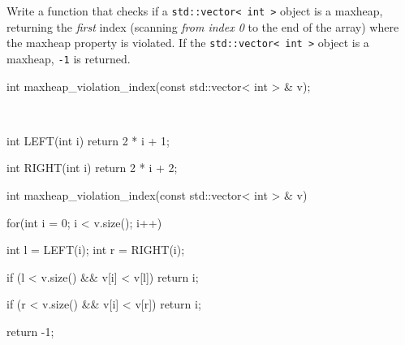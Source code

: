 \nextq
Write a function that checks if a \verb!std::vector< int >! object is a maxheap,
returning the \textit{first} index
(scanning \textit{from index 0} to the end of the array)
where the maxheap property is violated.
If the \verb!std::vector< int >! object is a maxheap, \verb!-1! is returned.
\begin{console}[fontsize=\footnotesize]
int maxheap_violation_index(const std::vector< int > & v);
\end{console}
\\
\ANSWER
\begin{answercode}
int LEFT(int i)
{
  return 2 * i + 1;
}

int RIGHT(int i)
{
  return 2 * i + 2;
}

int maxheap_violation_index(const std::vector< int > & v)
{
  for(int i = 0; i < v.size(); i++)
  {
    int l = LEFT(i);
    int r = RIGHT(i);

    if (l < v.size() && v[i] < v[l])
      return i;

    if (r < v.size() && v[i] < v[r])
      return i;
  }
  return -1;
}
\end{answercode}


